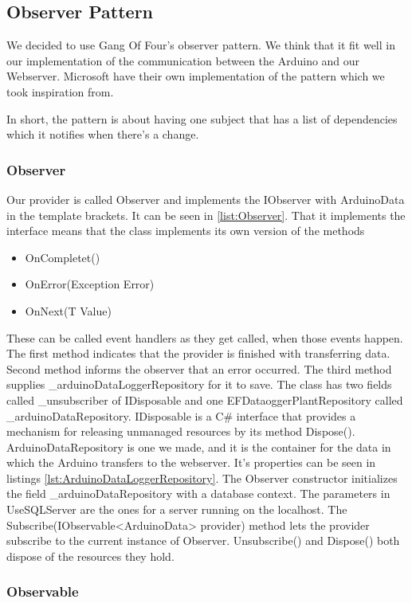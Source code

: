 \documentclass[a4paper,12pt,twoside,openright,titlepage]{book}
\begin{document}
\subsection{Observer Pattern}
We decided to use Gang Of Four's observer pattern\cite{GoF}. We think that it fit well in our implementation of the communication between the Arduino and our Webserver. Microsoft have their own implementation of the pattern\cite{MicrosoftObserver} which we took inspiration from.
 
In short, the pattern is about having one subject that has a list of dependencies which it notifies when there's a change.

\subsubsection{Observer}
Our provider is called Observer and implements the IObserver with ArduinoData in the template brackets. It can be seen in \ref{list:Observer}. That it implements the interface means that the class implements its own version of the methods
\begin{itemize}
\item OnCompletet()
\item OnError(Exception Error)
\item OnNext(T Value)
\end{itemize}

These can be called event handlers as they get called, when those events happen. The first method indicates that the provider is finished with transferring data. Second method informs the observer that an error occurred. The third method supplies \_arduinoDataLoggerRepository for it to save.
The class has two fields called \_unsubscriber of IDisposable and one EFDataoggerPlantRepository called \_arduinoDataRepository. IDisposable is a C\# interface that provides a mechanism for releasing unmanaged resources by its method Dispose(). ArduinoDataRepository is one we made, and it is the container for the data in which the Arduino transfers to the webserver. It's properties can be seen in listings \ref{lst:ArduinoDataLoggerRepository}. The Observer constructor initializes the field \_arduinoDataRepository with a database context. The parameters in UseSQLServer are the ones for a server running on the localhost. The Subscribe(IObservable<ArduinoData> provider) method lets the provider subscribe to the current instance of Observer. Unsubscribe() and Dispose() both dispose of the resources they hold. 

\subsubsection{Observable}
\end{document}
